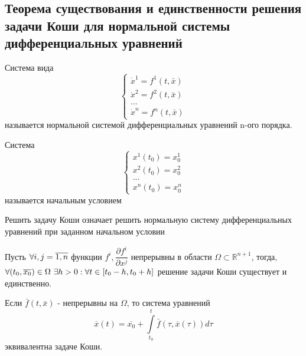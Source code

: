 \subsection{Теорема существования и единственности решения задачи Коши для нормальной системы дифференциальных уравнений}

\begin{definition}
	Система вида
	\begin{equation}
		\label{equ:norm-sys}
		\begin{cases*}
			\dot{x}^1 = f^1(t, \bar{x}) \\
			\dot{x}^2 = f^2(t, \bar{x}) \\
			... \\
			\dot{x}^n = f^n(t, \bar{x})
		\end{cases*}
	\end{equation}
	называется нормальной системой дифференциальных уравнений n-ого порядка.
	
\end{definition}

\begin{definition}
	Система
	\begin{equation}
		\label{equ:init-cond}
		\begin{cases*}
			x^1(t_0) = x_0^1 \\
			x^2(t_0) = x_0^2 \\
			... \\
			x^n(t_0) = x_0^n
		\end{cases*}
	\end{equation}
	называется начальным условием
\end{definition}	

\begin{proposition}
	Решить задачу Коши означает решить нормальную систему дифференциальных уравнений при заданном начальном условии
\end{proposition}

\begin{theorem} \label{ОсновнаяТеорема}
	Пусть $\forall i, j \hm= \overline{1, n}$ функции $f^i, \dfrac{\partial{f^i}}{\partial{x^j}}$ непрерывны в области $\Omega \subset \mathbb{R}^{n+1}$, тогда, $\forall (t_0, \overline{x_0}) \in \Omega \text{ } \exists h>0 : \forall t \hm\in [t_0-h, t_0+h]$ решение задачи Коши существует и единственно.
\end{theorem}

\begin{lemma}
	Если $\bar{f}(t, \bar{x})$ - непрерывны на $\Omega$, то система уравнений
	\begin{equation}
		\label{equ:int-sys}
		\overline{x}(t) = \overline{x_0} + \int\limits_{t_0}^t\bar{f}(\tau, \overline{x}(\tau))d\tau
	\end{equation}
	эквивалентна задаче Коши.
\end{lemma}

